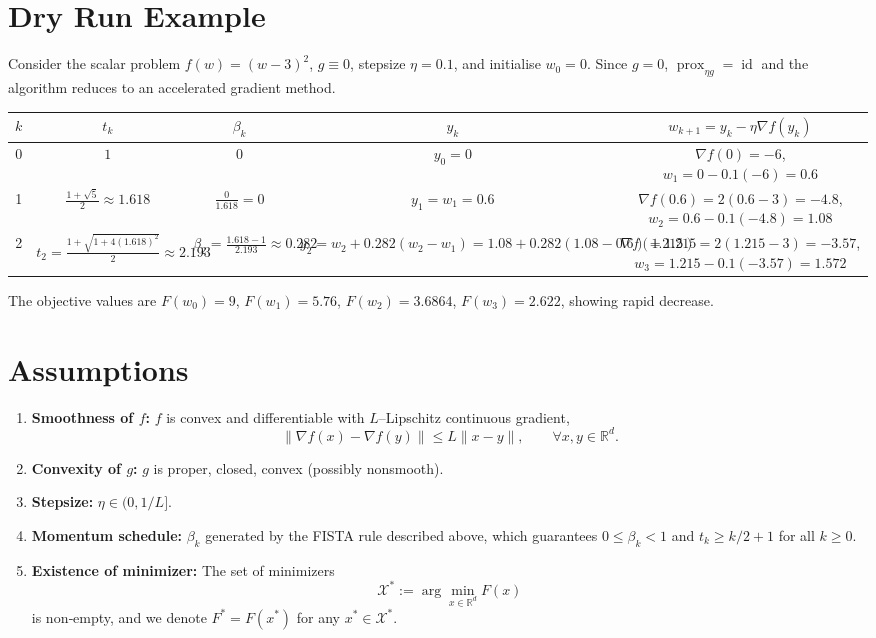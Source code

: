 \documentclass{article}
\newcommand{\prox}{\operatorname{prox}}
\newcommand{\R}{\mathbb{R}}
\begin{document}
\section*{Dry Run Example}
Consider the scalar problem $f(w)=(w-3)^{2}$, $g\equiv0$, stepsize $\eta=0.1$, and initialise $w_{0}=0$.  
Since $g=0$, $\prox_{\eta g}= \operatorname{id}$ and the algorithm reduces to an accelerated gradient method.

\begin{center}
\begin{tabular}{c|c|c|c|c}
$k$ & $t_k$ & $\beta_k$ & $y_k$ & $w_{k+1}=y_k-\eta\nabla f(y_k)$ \\ \hline
0 & $1$ & $0$ & $y_0=0$ & $\nabla f(0)= -6$, $w_1=0-0.1(-6)=0.6$ \\
1 & $\frac{1+\sqrt{5}}{2}\approx1.618$ & $\frac{0}{1.618}=0$ & $y_1=w_1=0.6$ & $\nabla f(0.6)=2(0.6-3)=-4.8$, $w_2=0.6-0.1(-4.8)=1.08$ \\
2 & $t_2=\frac{1+\sqrt{1+4(1.618)^2}}{2}\approx2.193$ & $\beta_2=\frac{1.618-1}{2.193}\approx0.282$ & $y_2=w_2+0.282(w_2-w_1)=1.08+0.282(1.08-0.6)=1.215$ &
$\nabla f(1.215)=2(1.215-3)=-3.57$, $w_3=1.215-0.1(-3.57)=1.572$ \\
\end{tabular}
\end{center}
The objective values are $F(w_0)=9$, $F(w_1)=5.76$, $F(w_2)=3.6864$, $F(w_3)=2.622$,
showing rapid decrease.

\newpage
\section*{Assumptions}
\begin{enumerate}
\item \textbf{Smoothness of $f$:} $f$ is convex and differentiable with $L$–Lipschitz continuous gradient,
\[
\|\nabla f(x)-\nabla f(y)\|\le L\|x-y\|,\qquad\forall x,y\in\R^{d}. \tag{A1}
\]
\item \textbf{Convexity of $g$:} $g$ is proper, closed, convex (possibly nonsmooth). 
\item \textbf{Stepsize:} $\eta\in(0,1/L]$. 
\item \textbf{Momentum schedule:} $\beta_k$ generated by the FISTA rule described above, which guarantees $0\le\beta_k<1$ and $t_k\ge k/2+1$ for all $k\ge0$. 
\item \textbf{Existence of minimizer:} The set of minimizers
\[
\mathcal{X}^{*}:=\arg\min_{x\in\R^{d}}F(x)
\]
is non‑empty, and we denote $F^{*}=F(x^{*})$ for any $x^{*}\in\mathcal{X}^{*}$. 
\end{enumerate}
\end{document}
